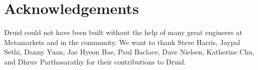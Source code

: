 \documentclass{vldb}
\begin{document}
\section{Acknowledgements}
\label{sec:acknowledgements}
Druid could not have been built without the help of many great
engineers at Metamarkets and in the community. We want to thank Steve
Harris, Jaypal Sethi, Danny Yuan, Jae Hyeon Bae, Paul Baclace, Dave
Nielsen, Katherine Chu, and Dhruv Parthasarathy for their
contributions to Druid.




\end{document}
